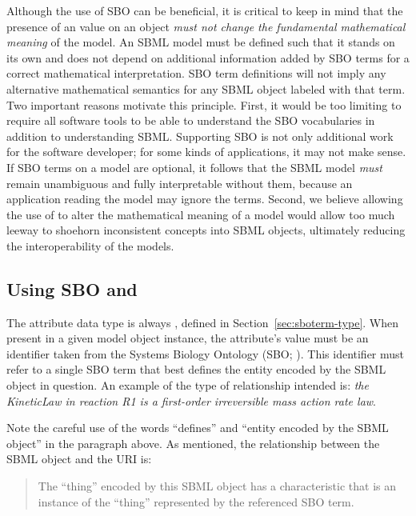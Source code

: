 Although the use of SBO can be beneficial, it is critical to keep
in mind that the presence of an  value on an object
\emph{must not change the fundamental mathematical meaning} of the
model.  An SBML model must be defined such that it stands on its
own and does not depend on additional information added by SBO
terms for a correct mathematical interpretation.  SBO term
definitions will not imply any alternative mathematical semantics
for any SBML object labeled with that term.  Two important
reasons motivate this principle.  First, it would be too limiting
to require all software tools to be able to understand the SBO
vocabularies in addition to understanding SBML.
Supporting SBO is not only additional work for the software
developer; for some kinds of applications, it may not make sense.
If SBO terms on a model are optional, it follows that the SBML
model \emph{must} remain unambiguous and fully interpretable
without them, because an application reading the model may ignore
the terms.  Second, we believe allowing the use of 
to alter the mathematical meaning of a model would allow
  too much leeway to shoehorn inconsistent concepts into SBML
objects, ultimately reducing the interoperability of the
models.

\subsection{Using SBO and }

The  attribute data type is always
, defined in Section~\ref{sec:sboterm-type}.
When present in a given model object instance, the
attribute's value must be an identifier taken from the
Systems Biology Ontology (SBO; \sboref).  This identifier must
refer to a single SBO term that best defines the entity encoded by
the SBML object in question.  An example of the type of
relationship intended is: \emph{the KineticLaw in reaction R1 is a
  first-order irreversible mass action rate law}.

Note the careful use of the words ``defines'' and ``entity encoded
by the SBML object'' in the paragraph above.  As mentioned, the
relationship between the SBML object and the URI is:

\begin{quote}
  The ``thing'' encoded by this SBML object has a characteristic
  that is an instance of the ``thing'' represented by the
  referenced SBO term.
\end{quote}

